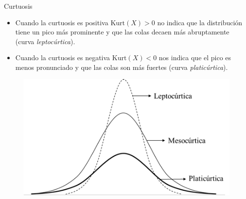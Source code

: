 \documentclass{beamer}
\begin{document}
\begin{frame}{Curtuosis}
  \begin{block}{}
    \begin{itemize}
  \item Cuando la curtuosis es positiva $\text{Kurt}(X)>0$ no indica que la
  distribución tiene un pico más prominente y que las colas decaen más
  abruptamente (curva \textit{leptocúrtica}).
  \item Cuando la curtuosis es negativa $\text{Kurt}(X)<0$ nos indica que el pico
  es menos pronunciado y que las colas son más fuertes (curva \textit{platicúrtica}).
    \end{itemize}
  \end{block}
  \begin{figure}[h!]
    \centering
    \includegraphics[scale=1]{figures/curtuosis.png}
  \end{figure}
\end{frame}
\end{document}

